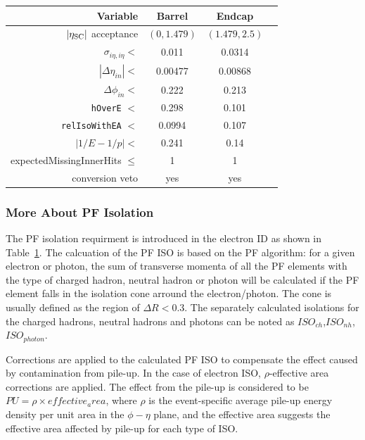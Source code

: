 \begin{table}[htb!]
  \center
  \label{tab:electron-id}
  \begin{tabular}{r c c c}
    \hline
    Variable & Barrel & Endcap \\
    \hline
    $|\eta_{\rm SC}|$ acceptance & $(0, 1.479)$ & $(1.479, 2.5)$\\
    $\sigma_{i\eta,i\eta} <$ & 0.011  & 0.0314 \\
    $|\Delta\eta_{in}| <$ & 0.00477  & 0.00868 \\
    $\Delta\phi_{in} <$ & 0.222  & 0.213 \\
    \texttt{hOverE} $<$ & 0.298  & 0.101 \\
    \texttt{relIsoWithEA} $<$ & 0.0994  & 0.107 \\
    $|1/E - 1/p| <$ & 0.241  & 0.14 \\
    expectedMissingInnerHits $\leq$ & 1  & 1 \\
    conversion veto & yes  & yes \\
    \hline
  \end{tabular}
\end{table}

\subsubsection{More About PF Isolation}
The PF isolation requirment is introduced in the electron ID as shown in Table~\ref{tab:electron-id}. The calcuation of the PF ISO is based on the PF algorithm: for a given electron or photon, the sum of transverse momenta of all the PF elements with the type of charged hadron, neutral hadron or photon will be calculated if the PF element falls in the isolation cone arround the electron/photon. The cone is usually defined as the region of $\Delta R<0.3$. The separately calculated isolations for the charged hadrons, neutral hadrons and photons can be noted as $ISO_{ch}$,$ISO_{nh}$,$ISO_{photon}$.

\vspace{0.3cm}
Corrections are applied to the calculated PF ISO to compensate the effect caused by contamination from pile-up. In the case of electron ISO, $\rho$-effective area corrections are applied. The effect from the pile-up is considered to be $PU= \rho \times effective_area$, where $\rho$ is the event-specific average pile-up energy density per unit area in the $\phi-\eta$ plane, and the effective area suggests the effective area affected by pile-up for each type of ISO. 

